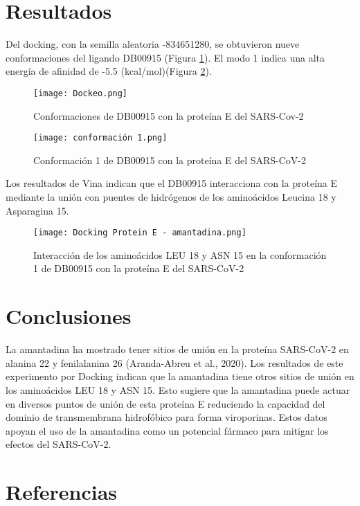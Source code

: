 \documentclass[titlepage, 12pt]{article}
\begin{document}
\section{Resultados}

Del docking, con la semilla aleatoria -834651280, se obtuvieron nueve conformaciones del ligando DB00915 
(Figura \ref{docking}). El modo 1 indica una alta energía de afinidad de -5.5 (kcal/mol)(Figura \ref{modo 1}). 


\begin{figure}
    \centering
    \texttt{[image: Dockeo.png]}
    \caption{Conformaciones de DB00915 con la proteína E del SARS-Cov-2}
    \label{docking}
\end{figure}


\begin{figure}
    \centering
    \texttt{[image: conformación 1.png]}
    \caption{Conformación 1 de DB00915 con la proteína E del SARS-CoV-2}
    \label{modo 1}
\end{figure}


Los resultados de Vina indican que el DB00915 interacciona con la proteína E mediante la unión con puentes de hidrógenos de los aminoácidos Leucina 18 y Asparagina 15.

\begin{figure}
    \centering
    \texttt{[image: Docking Protein E - amantadina.png]}
    \caption{Interacción de los aminoácidos LEU 18 y ASN 15 en la conformación 1 de DB00915 con la proteína E del SARS-CoV-2}
    \label{aminoácidos}
\end{figure}

\section{Conclusiones}

La amantadina ha mostrado tener sitios de unión en la proteína SARS-CoV-2 en alanina 22 y fenilalanina 26 (Aranda-Abreu et al., 2020). Los resultados de este experimento por Docking indican que la amantadina tiene otros sitios de unión en los aminoácidos LEU 18 y ASN 15. Esto sugiere que la amantadina puede actuar en diversos puntos de unión de esta proteína E reduciendo la capacidad del dominio de transmembrana hidrofóbico para forma viroporinas. Estos datos apoyan el uso de la amantadina como un potencial fármaco para mitigar los efectos del SARS-CoV-2.


\section{Referencias}
\end{document}
